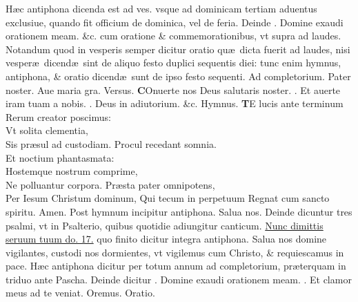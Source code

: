 \documentclass[a5paper,10pt]{book}
\def\ae{æ}
\begin{document}
\begin{multicols*}{2}
\newline {} \color{red} H\ae c antiphona dicenda est ad ves. vsque ad dominicam tertiam aduentus exclusiue, quando fit officium de dominica, vel de feria. Deinde \Vbar . \color{black} Domine exaudi orationem meam. \&c. \color{red} cum oratione \& commemorationibus, vt supra ad laudes. \color{black}
\newline \color{red} Notandum quod in vesperis semper dicitur oratio qu\ae \ dicta fuerit
ad laudes, nisi vesper\ae \ dicend\ae \ sint de aliquo festo duplici sequentis diei: tunc enim hymnus, antiphona, \& oratio dicend\ae \ sunt de ipso festo sequenti. \color{black}
\newline {} \color{red} Ad \hypertarget{DOM-PRIMA-ADV-COM}{completorium.} \color{black}
Pater noster. Aue maria gra. \quad \color{red} Versus. \color{black}
\vspace{-.25em}
\lettrine[lines=2]{\bfseries C}{}Onuerte nos Deus salutaris noster. \color{red} \Rbar . \color{black} Et auerte iram tuam a nobis. \color{red} \Vbar . \color{black} Deus in adiutorium. \color{red} \&c. Hymnus. \color{black}
\vspace{-.25em}
\lettrine[lines=2]{\bfseries \color{red} T}{}E lucis ante terminum\\Rerum creator poscimus:\\Vt solita clementia,\\Sis pr\ae sul ad custodiam.
\newline \color{red} P\color{black}rocul recedant somnia.\\Et noctium phantasmata:\\Hostemque nostrum comprime,\\Ne polluantur corpora.
\newline \color{red} P\color{black}r\ae sta pater omnipotens,\\Per Iesum Christum dominum, Qui tecum in perpetuum Regnat cum sancto spiritu. Amen.
\newline {} \color{red} Post hymnum incipitur antiphona. \color{black} Salua nos. \color{red} Deinde dicuntur tres psalmi, vt in Psalterio, quibus quotidie adiungitur canticum. \color{black} \hyperlink{Nunc}{Nunc dimittis seruum tuum do. 17.} \color{red} quo finito dicitur integra antiphona. \color{black} Salua nos domine vigilantes, custodi nos dormientes, vt vigilemus cum Christo, \& requiescamus in pace.
\newline {} \color{red} H\ae c antiphona dicitur per totum annum ad completorium, pr\ae terquam in triduo ante Pascha. Deinde dicitur \Vbar . \color{black} Domine exaudi orationem meam. \color{red} \Rbar . \color{black} Et clamor meus ad te veniat. \color{red} O\color{black}remus. \color{red} Oratio. \color{black}

\end{multicols*}
\end{document}
